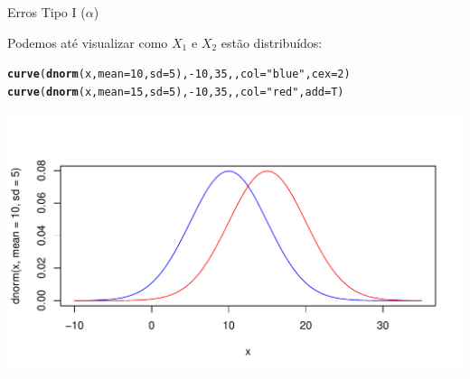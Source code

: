 \documentclass{beamer}\usepackage[]{graphicx}\usepackage[]{color}
\makeatletter
\def\maxwidth{ %
  \ifdim\Gin@nat@width>\linewidth
    \linewidth
  \else
    \Gin@nat@width
  \fi
}
\newcommand{\hlnum}[1]{\textcolor[rgb]{0.686,0.059,0.569}{#1}}%
\newcommand{\hlstr}[1]{\textcolor[rgb]{0.192,0.494,0.8}{#1}}%
\newcommand{\hlopt}[1]{\textcolor[rgb]{0,0,0}{#1}}%
\newcommand{\hlstd}[1]{\textcolor[rgb]{0.345,0.345,0.345}{#1}}%
\newcommand{\hlkwc}[1]{\textcolor[rgb]{0.333,0.667,0.333}{#1}}%
\newcommand{\hlkwd}[1]{\textcolor[rgb]{0.737,0.353,0.396}{\textbf{#1}}}%
\newenvironment{kframe}{%
 \def\at@end@of@kframe{}%
 \ifinner\ifhmode%
  \def\at@end@of@kframe{\end{minipage}}%
  \begin{minipage}{\columnwidth}%
 \fi\fi%
 \def\FrameCommand##1{\hskip\@totalleftmargin \hskip-\fboxsep
 \colorbox{shadecolor}{##1}\hskip-\fboxsep
     \hskip-\linewidth \hskip-\@totalleftmargin \hskip\columnwidth}%
 \MakeFramed {\advance\hsize-\width
   \@totalleftmargin\z@ \linewidth\hsize
   \@setminipage}}%
 {\par\unskip\endMakeFramed%
 \at@end@of@kframe}
\newenvironment{knitrout}{}{} %
\renewenvironment{knitrout}{\setlength{\topsep}{0mm}}{}
\makeatother
\begin{document}
\begin{frame}[fragile]{Erros Tipo I ($\alpha$)}

\small{Podemos até visualizar como $X_1$ e $X_2$ estão distribuídos:}

\begin{knitrout}\tiny
{}\color{fgcolor}\begin{kframe}
\begin{alltt}
\hlkwd{curve}\hlstd{(}\hlkwd{dnorm}\hlstd{(x,} \hlkwc{mean} \hlstd{=} \hlnum{10}\hlstd{,} \hlkwc{sd} \hlstd{=} \hlnum{5}\hlstd{),} \hlopt{-}\hlnum{10}\hlstd{,} \hlnum{35}\hlstd{, ,} \hlkwc{col} \hlstd{=} \hlstr{"blue"}\hlstd{,} \hlkwc{cex} \hlstd{=} \hlnum{2}\hlstd{)}
\hlkwd{curve}\hlstd{(}\hlkwd{dnorm}\hlstd{(x,} \hlkwc{mean} \hlstd{=} \hlnum{15}\hlstd{,} \hlkwc{sd} \hlstd{=} \hlnum{5}\hlstd{),} \hlopt{-}\hlnum{10}\hlstd{,} \hlnum{35}\hlstd{, ,} \hlkwc{col} \hlstd{=} \hlstr{"red"}\hlstd{,} \hlkwc{add} \hlstd{= T)}
\end{alltt}
\end{kframe}
\includegraphics[width=\maxwidth]{figure/erro_alfa_4-1} 

\end{knitrout}


\end{frame}
\end{document}
